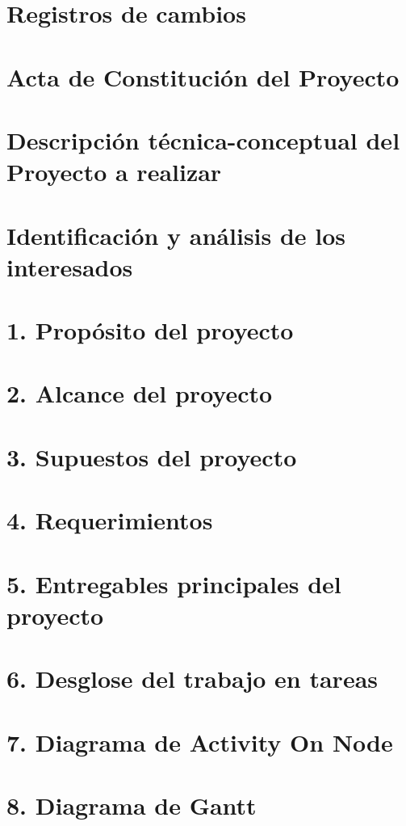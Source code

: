 \documentclass[12pt]{charter}
\begin{document}
\maketitle
\thispagestyle{empty}
\pagebreak

\thispagestyle{empty}
\tableofcontents{}
\pagebreak

\section{Registros de cambios}
\section{Acta de Constitución del Proyecto}
\section{Descripción técnica-conceptual del Proyecto a realizar}
\section{Identificación y análisis de los interesados}
\section{1. Propósito del proyecto}
\section{2. Alcance del proyecto}
\section{3. Supuestos del proyecto}
\section{4. Requerimientos}
\section{5. Entregables principales del proyecto}
\section{6. Desglose del trabajo en tareas}
\section{7. Diagrama de Activity On Node}
\section{8. Diagrama de Gantt}
\end{document}
